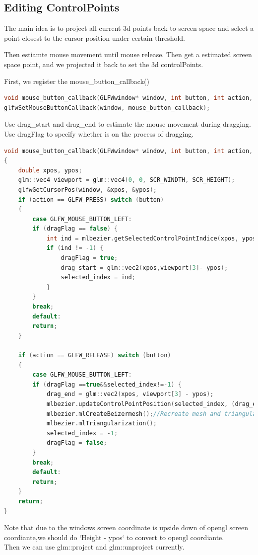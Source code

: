 \documentclass[acmtog]{acmart}
\begin{document}
\subsection{Editing ControlPoints}
The main idea is to project all current 3d points back to screen space and select a point closest to the cursor position under certain threshold.
\par Then estiamte mouse movement until mouse release. Then get a estimated screen space point, and we projected it back to set the 3d controlPoints.
\par First, we register the mouse\_button\_callback() 
\begin{lstlisting}[frame=single,breaklines=true,language=c++,basicstyle=\footnotesize\ttfamily]
void mouse_button_callback(GLFWwindow* window, int button, int action, int mods);
glfwSetMouseButtonCallback(window, mouse_button_callback);
\end{lstlisting}
Use drag\_start and drag\_end to estimate the mouse movement during dragging. \\Use dragFlag to specify whether is on the process of dragging.
\begin{lstlisting}[frame=single,breaklines=true,language=c++,basicstyle=\footnotesize\ttfamily]
void mouse_button_callback(GLFWwindow* window, int button, int action, int mods)
{
	double xpos, ypos;
	glm::vec4 viewport = glm::vec4(0, 0, SCR_WINDTH, SCR_HEIGHT);
	glfwGetCursorPos(window, &xpos, &ypos);
	if (action == GLFW_PRESS) switch (button)
	{
		case GLFW_MOUSE_BUTTON_LEFT:
		if (dragFlag == false) {
			int ind = mlbezier.getSelectedControlPointIndice(xpos, ypos, view, projection, viewport);
			if (ind != -1) {
				dragFlag = true;
				drag_start = glm::vec2(xpos,viewport[3]- ypos);
				selected_index = ind;
			}
		}
		break;
		default:
		return;
	}
	
	if (action == GLFW_RELEASE) switch (button)
	{
		case GLFW_MOUSE_BUTTON_LEFT:
		if (dragFlag ==true&&selected_index!=-1) {
			drag_end = glm::vec2(xpos, viewport[3] - ypos);
			mlbezier.updateControlPointPosition(selected_index, (drag_end - drag_start),view,projection,viewport);
			mlbezier.mlCreateBeizermesh();//Recreate mesh and triangularization
			mlbezier.mlTriangularization();
			selected_index = -1;
			dragFlag = false;
		}
		break;
		default:
		return;
	}
	return;
}
\end{lstlisting}
Note that due to the windows screen coordinate is upside down of opengl screen coordiante,we should do `Height - ypos` to convert to opengl coordiante.
\\Then we can use glm::project and glm::unproject currently.
\end{document}
